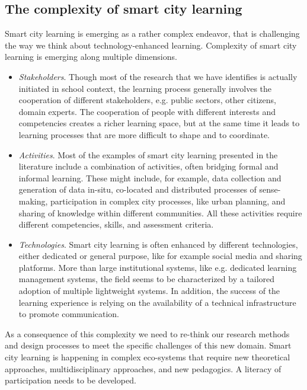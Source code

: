 \subsection*{The complexity of smart city learning}
Smart city learning is emerging as a rather complex endeavor, that is challenging the way we think about technology-enhanced learning. Complexity of smart city learning is emerging along multiple dimensions.
\begin{itemize}
\item \textit{Stakeholders}. Though most of the research that we have identifies is actually initiated in school context, the learning process generally involves the cooperation of different stakeholders, e.g. public sectors, other citizens, domain experts. The cooperation of people with different interests and competencies creates a richer learning space, but at the same time it leads to learning processes that are more difficult to shape and to coordinate.
\item \textit{Activities}. Most of the examples of smart city learning presented in the literature include a combination of activities, often bridging formal and informal learning. These might include, for example, data collection and generation of data in-situ, co-located and distributed processes of sense-making, participation in complex city processes, like urban planning, and sharing of knowledge within different communities. All these activities require different competencies, skills, and assessment criteria.
\item \textit{Technologies}. Smart city learning is often enhanced by different technologies, either dedicated or general purpose, like for example social media and sharing platforms. More than large institutional systems, like e.g. dedicated learning management systems, the field seems to be characterized by a tailored adoption of multiple lightweight systems. In addition, the success of the learning experience is relying on the availability of a technical infrastructure to promote communication.
\end{itemize}

As a consequence of this complexity we need to re-think our research methods and design processes to meet the specific challenges of this new domain. Smart city learning is happening in complex eco-systems that require new theoretical approaches, multidisciplinary approaches, and new pedagogics. A literacy of participation needs to be developed.


